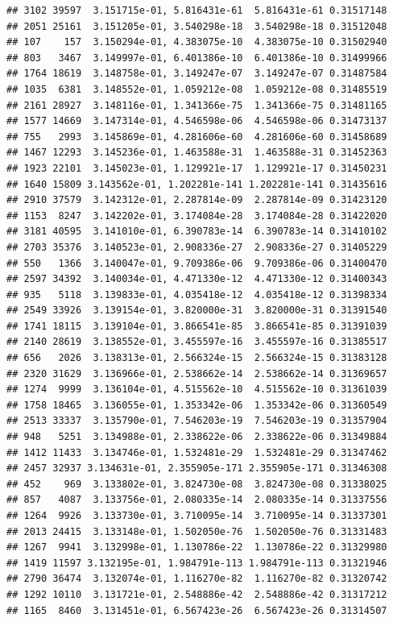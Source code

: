 \documentclass[
]{article}
\begin{document}
\begin{verbatim}
## 3102 39597  3.151715e-01, 5.816431e-61  5.816431e-61 0.31517148
## 2051 25161  3.151205e-01, 3.540298e-18  3.540298e-18 0.31512048
## 107    157  3.150294e-01, 4.383075e-10  4.383075e-10 0.31502940
## 803   3467  3.149997e-01, 6.401386e-10  6.401386e-10 0.31499966
## 1764 18619  3.148758e-01, 3.149247e-07  3.149247e-07 0.31487584
## 1035  6381  3.148552e-01, 1.059212e-08  1.059212e-08 0.31485519
## 2161 28927  3.148116e-01, 1.341366e-75  1.341366e-75 0.31481165
## 1577 14669  3.147314e-01, 4.546598e-06  4.546598e-06 0.31473137
## 755   2993  3.145869e-01, 4.281606e-60  4.281606e-60 0.31458689
## 1467 12293  3.145236e-01, 1.463588e-31  1.463588e-31 0.31452363
## 1923 22101  3.145023e-01, 1.129921e-17  1.129921e-17 0.31450231
## 1640 15809 3.143562e-01, 1.202281e-141 1.202281e-141 0.31435616
## 2910 37579  3.142312e-01, 2.287814e-09  2.287814e-09 0.31423120
## 1153  8247  3.142202e-01, 3.174084e-28  3.174084e-28 0.31422020
## 3181 40595  3.141010e-01, 6.390783e-14  6.390783e-14 0.31410102
## 2703 35376  3.140523e-01, 2.908336e-27  2.908336e-27 0.31405229
## 550   1366  3.140047e-01, 9.709386e-06  9.709386e-06 0.31400470
## 2597 34392  3.140034e-01, 4.471330e-12  4.471330e-12 0.31400343
## 935   5118  3.139833e-01, 4.035418e-12  4.035418e-12 0.31398334
## 2549 33926  3.139154e-01, 3.820000e-31  3.820000e-31 0.31391540
## 1741 18115  3.139104e-01, 3.866541e-85  3.866541e-85 0.31391039
## 2140 28619  3.138552e-01, 3.455597e-16  3.455597e-16 0.31385517
## 656   2026  3.138313e-01, 2.566324e-15  2.566324e-15 0.31383128
## 2320 31629  3.136966e-01, 2.538662e-14  2.538662e-14 0.31369657
## 1274  9999  3.136104e-01, 4.515562e-10  4.515562e-10 0.31361039
## 1758 18465  3.136055e-01, 1.353342e-06  1.353342e-06 0.31360549
## 2513 33337  3.135790e-01, 7.546203e-19  7.546203e-19 0.31357904
## 948   5251  3.134988e-01, 2.338622e-06  2.338622e-06 0.31349884
## 1412 11433  3.134746e-01, 1.532481e-29  1.532481e-29 0.31347462
## 2457 32937 3.134631e-01, 2.355905e-171 2.355905e-171 0.31346308
## 452    969  3.133802e-01, 3.824730e-08  3.824730e-08 0.31338025
## 857   4087  3.133756e-01, 2.080335e-14  2.080335e-14 0.31337556
## 1264  9926  3.133730e-01, 3.710095e-14  3.710095e-14 0.31337301
## 2013 24415  3.133148e-01, 1.502050e-76  1.502050e-76 0.31331483
## 1267  9941  3.132998e-01, 1.130786e-22  1.130786e-22 0.31329980
## 1419 11597 3.132195e-01, 1.984791e-113 1.984791e-113 0.31321946
## 2790 36474  3.132074e-01, 1.116270e-82  1.116270e-82 0.31320742
## 1292 10110  3.131721e-01, 2.548886e-42  2.548886e-42 0.31317212
## 1165  8460  3.131451e-01, 6.567423e-26  6.567423e-26 0.31314507

\end{verbatim}
\end{document}
